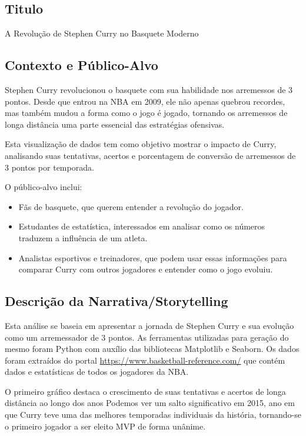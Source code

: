 \subsection*{\textbf{Titulo}}
\noindent A Revolução de Stephen Curry no Basquete Moderno


\subsection*{\textbf{Contexto e Público-Alvo}}
Stephen Curry revolucionou o basquete com sua habilidade nos arremessos de 3 pontos. Desde que entrou
na NBA em 2009, ele não apenas quebrou recordes, mas também mudou a forma como o jogo é jogado,
tornando os arremessos de longa distância uma parte essencial das estratégias ofensivas.

Esta visualização de dados tem como objetivo mostrar o impacto de Curry, analisando suas tentativas,
acertos e porcentagem de conversão de arremessos de 3 pontos por temporada.

O público-alvo inclui:
\begin{itemize}
    \item Fãs de basquete, que querem entender a revolução do jogador.
    \item Estudantes de estatística, interessados em analisar como os números traduzem a influência de um
atleta.
    \item Analistas esportivos e treinadores, que podem usar essas informações para comparar Curry com
outros jogadores e entender como o jogo evoluiu.
\end{itemize}

\subsection*{\textbf{Descrição da Narrativa/Storytelling}}
Esta análise se baseia em apresentar a jornada de Stephen Curry e sua evolução como um arremessador de
3 pontos. As ferramentas utilizadas para geração do mesmo foram Python com auxílio das bibliotecas
Matplotlib e Seaborn. Os dados foram extraídos do portal \url{https://www.basketball-reference.com/} que contém
dados e estatísticas de todos os jogadores da NBA.

O primeiro gráfico destaca o crescimento de suas tentativas e acertos de longa distância ao longo dos anos
Podemos ver um salto significativo em 2015, ano em que Curry teve uma das melhores temporadas
individuais da história, tornando-se o primeiro jogador a ser eleito MVP de forma unânime.

